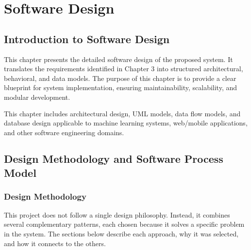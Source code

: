 \chapter{Software Design}

\section{Introduction to Software Design}

This chapter presents the detailed software design of the proposed system. It translates the requirements identified in Chapter 3 into structured architectural, behavioral, and data models. The purpose of this chapter is to provide a clear blueprint for system implementation, ensuring maintainability, scalability, and modular development.

This chapter includes architectural design, UML models, data flow models, and database design applicable to machine learning systems, web/mobile applications, and other software engineering domains.

\section{Design Methodology and Software Process Model}

\subsection{Design Methodology}

This project does not follow a single design philosophy. Instead, it combines several
complementary patterns, each chosen because it solves a specific problem in the system.
The sections below describe each approach, why it was selected, and how it connects to
the others.

